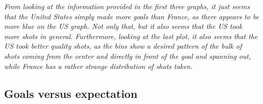 \documentclass[]{article}
\newenvironment{Shaded}{\begin{snugshade}}{\end{snugshade}}
\newcommand{\DataTypeTok}[1]{\textcolor[rgb]{0.13,0.29,0.53}{#1}}
\newcommand{\KeywordTok}[1]{\textcolor[rgb]{0.13,0.29,0.53}{\textbf{#1}}}
\newcommand{\NormalTok}[1]{#1}
\newcommand{\OperatorTok}[1]{\textcolor[rgb]{0.81,0.36,0.00}{\textbf{#1}}}
\newcommand{\StringTok}[1]{\textcolor[rgb]{0.31,0.60,0.02}{#1}}
\begin{document}
\begin{Shaded}
\end{Shaded}

\emph{From looking at the information provided in the first three
graphs, it just seems that the United States simply made more goals than
France, as there appears to be more blue on the US graph. Not only that,
but it also seems that the US took more shots in general. Furthermore,
looking at the last plot, it also seems that the US took better quality
shots, as the bins show a desired pattern of the bulk of shots coming
from the center and directly in front of the goal and spanning out,
while France has a rather strange distribution of shots taken.}

\hypertarget{goals-versus-expectation}{%
\subsection{Goals versus expectation}\label{goals-versus-expectation}}
\end{document}
